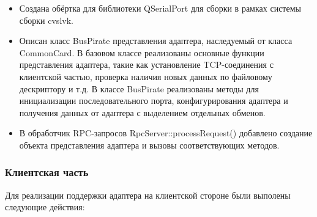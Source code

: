 \begin{itemize}
 \item Создана обёртка для библиотеки QSerialPort для сборки в рамках системы сборки cvslvk.
 \item Описан класс BusPirate представления адаптера, наследуемый от класса CommonCard. В базовом классе реализованы основные функции представления адаптера, такие как установление TCP-соединения с клиентской частью, проверка наличия новых данных по файловому дескриптору и т.д. В классе BusPirate реализованы методы для инициализации последовательного порта, конфигурирования адаптера и получения данных от адаптера с выделением отдельных обменов.
 \item В обработчик RPC-запросов RpcServer::processRequest() добавлено создание объекта представления адаптера и вызовы соответствующих методов.
\end{itemize}


\subsubsection*{Клиентская часть}

\label{client_implementation}

Для реализации поддержки адаптера на клиентской стороне были выполены следующие действия:

